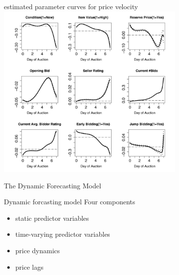 \documentclass[hyperref={pdfpagelabels=false}]{beamer}
\begin{document}
\begin{frame}{estimated parameter curves for price velocity}
\center
\includegraphics[width=0.7\textwidth]{price_velocity} %
\end{frame} %

\begin{frame}
\centering
The Dynamic Forecasting Model
\end{frame}

\begin{frame}{Dynamic forcasting model}
Four components
\begin{itemize}
    \item static predictor variables
    \item time-varying predictor variables
    \item price dynamics
    \item price lags
\end{itemize}    
\end{frame}
\end{document}

